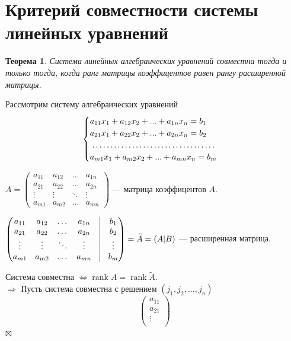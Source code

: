 \documentclass[a4paper, 12pt]{article}
\newtheorem*{theorem}{Теорема}
\newenvironment{Proof}
{\par\noindent{$\blacklozenge$}}
{\hfill$\scriptstyle\boxtimes$}
\newcommand{\rank}{\operatorname{rank}}
\begin{document}
\section{Критерий совместности системы линейных уравнений}
\begin{theorem}
	Система линейных алгебраических уравнений совместна тогда и только тогда, когда ранг матрицы коэффицентов равен рангу расширенной матрицы.
\end{theorem}
\begin{Proof}
	Рассмотрим систему алгебраических уравнений
   $$ \begin{cases}
        a_{11}x_1+a_{12}x_2+...+a_{1n}x_n=b_1\\
        a_{21}x_1+a_{22}x_2+...+a_{2n}x_n=b_2\\
        \dotfill\\
        a_{m1}x_1+a_{m2}x_2+...+a_{mn}x_n=b_m
    \end{cases}$$
    \begin{center}
    $A = \begin{pmatrix}
    a_{11} & a_{12} & \dots & a_{1n}\\
    a_{21} & a_{22} & \dots & a_{2n}\\
    \vdots & \vdots & \ddots & \vdots\\
    a_{m1} & a_{m2} & \dots & a_{mn}
    \end{pmatrix}$
    --- матрица коэффицентов $A$.\\
    \end{center}
    \begin{center}
     $\begin{pmatrix}
    a_{11} & a_{12} & \dots & a_{1n} & \vline & b_1\\
    a_{21} & a_{22} & \dots & a_{2n} & \vline & b_2\\
    \vdots & \vdots & \ddots & \vdots & \vline & \vdots\\
    a_{m1} & a_{m2} & \dots & a_{mn} & \vline & b_m
    \end{pmatrix} =
    \widetilde{A} = (A|B)$ --- расширенная матрица.   
    \end{center}
    Система совместна $\Leftrightarrow \rank A=\rank\widetilde{A}$. \\
    $\Rightarrow$ Пусть система совместна с решением $(j_1,j_2, \dots, j_n)$\\
    $$\begin{pmatrix}
    a_{11}\\
    a_{21}\\
    \vdots\\

\end{pmatrix}$$
\end{Proof}
\end{document}
